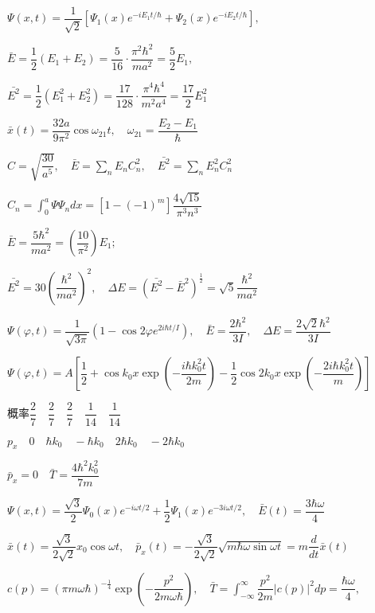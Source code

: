 \achapter
\answer $ \varPsi(x,t)=\dfrac{1}{\sqrt{2}}[\varPsi_{1}(x)e^{-iE_{1}t/\hbar}+\varPsi_{2}(x)e^{-iE_{2}t/\hbar}], $

  $ \bar{E}=\dfrac{1}{2}(E_{1}+E_{2})=\dfrac{5}{16}\cdot\dfrac{\pi^{2}\hbar^{2}}{ma^{2}}=\dfrac{5}{2}E_{1},\quad $

  $\bar{E^{2}}=\dfrac{1}{2}(E_{1}^{2}+E_{2}^{2})=\dfrac{17}{128}\cdot\dfrac{\pi^{4}\hbar^{4}}{m^{2}a^{4}}=\dfrac{17}{2}E_{1}^{2} $

  $ \bar{x}(t)=\dfrac{32a}{9\pi^{2}}\cos\omega_{21}t,\quad \omega_{21}=\dfrac{E_{2}-E_{1}}{\hbar} $

\answer $ C=\sqrt{\dfrac{30}{a^{5}}},\quad\bar{E}=\displaystyle{\sum_{n}}E_{n}C_{n}^{2},\quad \bar{E^{2}}=\displaystyle{\sum_{n}}E_{n}^{2}C_{n}^{2}$

  $ C_{n}=\int_{0}^{a}\varPsi\varPsi_{n}dx=[1-(-1)^{m}]\dfrac{4\sqrt{15}}{\pi^{3}n^{3}} $

  $ \bar{E}=\dfrac{5\hbar^{2}}{ma^{2}}=\left(\dfrac{10}{\pi^{2}}\right)E_{1};$

 $ \bar{E^{2}}=30\left(\dfrac{\hbar^{2}}{ma^{2}}\right)^{2},\quad \Delta E=(\bar{E^{2}}-\bar{E}^{2})^{\frac{1}{2}}=\sqrt{5}\dfrac{\hbar^{2}}{ma^{2}} $

\answer $ \varPsi(\varphi,t)=\dfrac{1}{\sqrt{3\pi}}(1-\cos2\varphi e^{2i\hbar t/I}),\quad \bar{E}=\dfrac{2\hbar^{2}}{3I},\quad \Delta E=\dfrac{2\sqrt{2}\hbar^{2}}{3I}$

\answer $ \varPsi(\varphi,t)=A\left[\dfrac{1}{2}+\cos k_{0}x\exp\left(-\dfrac{i\hbar k_{0}^{2}t}{2m}\right)-\dfrac{1}{2}\cos 2k_{0}x\exp\left(-\dfrac{2i\hbar k_{0}^{2}t}{m}\right) \right] $

  概率\quad$ \dfrac{2}{7}\quad	\dfrac{2}{7}\quad \dfrac{2}{7}\quad \dfrac{1}{14}\quad \dfrac{1}{14} $

  $ p_{x}\quad 0\quad \hbar k_{0}\quad -\hbar k_{0}\quad 2\hbar k_{0}\quad -2\hbar k_{0} $

  $ \bar{p}_{x}=0\quad \bar{T}=\dfrac{4\hbar^{2}k_{0}^{2}}{7m} $

\answer $ \varPsi(x,t)=\dfrac{\sqrt{3}}{2}\varPsi_{0}(x)e^{-i\omega t/2}+\dfrac{1}{2}\varPsi_{1}(x)e^{-3i\omega t/2},\quad \bar{E}(t)=\dfrac{3\hbar\omega}{4} $

 $ \bar{x}(t)=\dfrac{\sqrt{3}}{2\sqrt{2}}x_{0}\cos\omega t,\quad \bar{p}_{x}(t)=-\dfrac{\sqrt{3}}{2\sqrt{2}}\sqrt{m\hbar\omega\sin\omega t}=m\dfrac{d}{dt}\bar{x}(t) $

\answer $ c(p)=(\pi m\omega\hbar)^{-\frac{1}{4}}\exp\left(-\dfrac{p^{2}}{2m\omega\hbar}\right),\quad \bar{T}=\int_{-\infty}^{\infty}\dfrac{p^{2}}{2m}|c(p)|^{2}dp=\dfrac{\hbar\omega}{4},\quad  $

